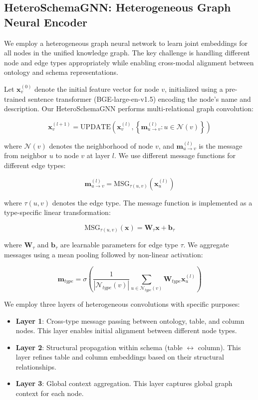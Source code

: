 \documentclass[sigconf, nonatbib]{acmart}
\begin{document}
\subsection{HeteroSchemaGNN: Heterogeneous Graph Neural Encoder}

We employ a heterogeneous graph neural network to learn joint embeddings for all nodes in the unified knowledge graph. The key challenge is handling different node and edge types appropriately while enabling cross-modal alignment between ontology and schema representations.

Let $\mathbf{x}_v^{(0)}$ denote the initial feature vector for node $v$, initialized using a pre-trained sentence transformer (BGE-large-en-v1.5) encoding the node's name and description. Our HeteroSchemaGNN performs multi-relational graph convolution:

\begin{equation}
    \mathbf{x}_v^{(l+1)} = \text{UPDATE}\left(\mathbf{x}_v^{(l)}, \left\{\mathbf{m}_{u \to v}^{(l)} : u \in \mathcal{N}(v)\right\}\right)
\end{equation}

where $\mathcal{N}(v)$ denotes the neighborhood of node $v$, and $\mathbf{m}_{u \to v}^{(l)}$ is the message from neighbor $u$ to node $v$ at layer $l$. We use different message functions for different edge types:

\begin{equation}
    \mathbf{m}_{u \to v}^{(l)} = \text{MSG}_{\tau(u,v)}\left(\mathbf{x}_u^{(l)}\right)
\end{equation}

where $\tau(u,v)$ denotes the edge type. The message function is implemented as a type-specific linear transformation:

\begin{equation}
    \text{MSG}_{\tau(u,v)}(\mathbf{x}) = \mathbf{W}_{\tau} \mathbf{x} + \mathbf{b}_{\tau}
\end{equation}

where $\mathbf{W}_{\tau}$ and $\mathbf{b}_{\tau}$ are learnable parameters for edge type $\tau$. We aggregate messages using a mean pooling followed by non-linear activation:

\begin{equation}
    \mathbf{m}_{type} = \sigma\left(\frac{1}{|\mathcal{N}_{type}(v)|} \sum_{u \in \mathcal{N}_{type}(v)} \mathbf{W}_{type} \mathbf{x}_u^{(l)}\right)
\end{equation}

We employ three layers of heterogeneous convolutions with specific purposes:
\begin{itemize}
    \item \textbf{Layer 1}: Cross-type message passing between ontology, table, and column nodes. This layer enables initial alignment between different node types.
    \item \textbf{Layer 2}: Structural propagation within schema (table $\leftrightarrow$ column). This layer refines table and column embeddings based on their structural relationships.
    \item \textbf{Layer 3}: Global context aggregation. This layer captures global graph context for each node.
\end{itemize}
\end{document}
